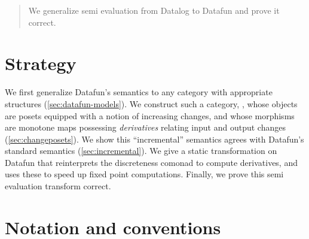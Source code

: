 \maketitle

\begin{abstract}
  We generalize semi\naive{} evaluation from Datalog to Datafun and prove it
  correct.
\end{abstract}

\section{Strategy}

We first generalize Datafun's \Poset{} semantics to any category with
appropriate structures (\cref{sec:datafun-models}). We construct such a
category, \CP{}, whose objects are posets equipped with a notion of increasing
changes, and whose morphisms are monotone maps possessing \emph{derivatives}
relating input and output changes (\cref{sec:changeposets}). We show this
``incremental'' semantics agrees with Datafun's standard semantics
(\cref{sec:incremental}). We give a static transformation on Datafun that
reinterprets the discreteness comonad to compute derivatives, and uses these to
speed up fixed point computations. Finally, we prove this semi\naive{}
evaluation transform correct.



\section{Notation and conventions}

